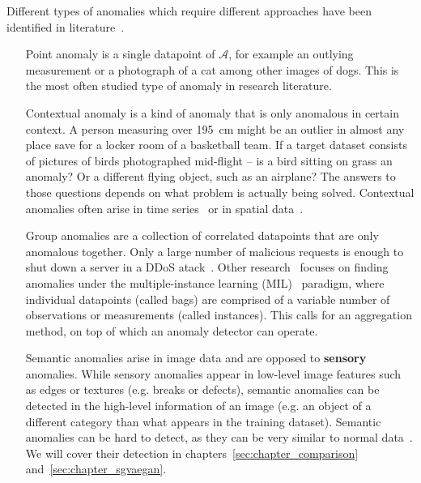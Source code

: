 Different types of anomalies which require different approaches have been identified in literature~\cite{chandola2009anomaly,ruff2020unifying}. 
\begin{itemize}
	\item[Point anomaly] is a single datapoint of $\mathcal{A}$, for example an outlying measurement or a photograph of a cat among other images of dogs. This is the most often studied type of anomaly in research literature.

	\item[Contextual] anomaly is a kind of anomaly that is only anomalous in certain context. A person measuring over 195~cm might be an outlier in almost any place save for a locker room of a basketball team. If a target dataset consists of pictures of birds photographed mid-flight -- is a bird sitting on grass an anomaly? Or a different flying object, such as an airplane? The answers to those questions depends on what problem is actually being solved. Contextual anomalies often arise in time series~\cite{tsay2000outliers} or in spatial data~\cite{chawla2006slom}.

	\item[Group anomalies] are a collection of correlated datapoints that are only anomalous together. Only a large number of malicious requests is enough to shut down a server in a DDoS atack~\cite{ahmed2018collective}. Other research~\cite{quellec2016multiple,wan2020weakly} focuses on finding anomalies under the multiple-instance learning (MIL)~\cite{carbonneau2018multiple} paradigm, where individual datapoints (called bags) are comprised of a variable number of observations or measurements (called instances). This calls for an aggregation method, on top of which an anomaly detector can operate.

	\item[Semantic] anomalies arise in image data and are opposed to \textbf{sensory} anomalies. While sensory anomalies appear in low-level image features such as edges or textures (e.g. breaks or defects), semantic anomalies can be detected in the high-level information of an image (e.g. an object of a different category than what appears in the  training dataset). Semantic anomalies can be hard to detect, as they can be very similar to normal data~\cite{ahmed2020detecting}. We will cover their detection in chapters~\ref{sec:chapter_comparison} and~\ref{sec:chapter_sgvaegan}.
\end{itemize}

